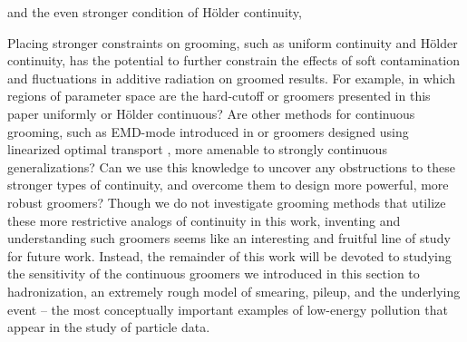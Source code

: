 
\noindent
and the even stronger condition of H\"older continuity,


Placing stronger constraints on grooming, such as uniform continuity and H\"older continuity, has the potential to further constrain the effects of soft contamination and fluctuations in additive radiation on groomed results.
%
For example, in which regions of parameter space are the hard-cutoff or \PIRANHA{} groomers presented in this paper uniformly or H\"older continuous?
%
Are other methods for continuous grooming, such as EMD-mode \PIRANHA{} introduced in  or \PIRANHA{} groomers designed using linearized optimal transport \cite{Cai:2020vzx,Cai:2021hnn,cai2022linearized,sarrazin2023linearized}, more amenable to strongly continuous generalizations?
%
Can we use this knowledge to uncover any obstructions to these stronger types of continuity, and overcome them to design more powerful, more robust groomers?
%
Though we do not investigate grooming methods that utilize these more restrictive analogs of continuity in this work, inventing and understanding such groomers seems like an interesting and fruitful line of study for future work.
%
Instead, the remainder of this work will be devoted to studying the sensitivity of the continuous groomers we introduced in this section to hadronization, an extremely rough model of smearing, pileup, and the underlying event -- the most conceptually important examples of low-energy pollution that appear in the study of particle data.


